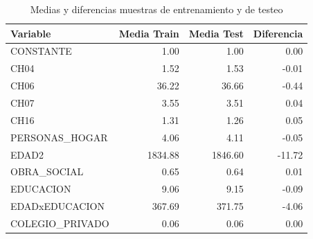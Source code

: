\begin{table}
\caption{Medias y diferencias muestras de entrenamiento y de testeo}
\label{tab:medias}
\begin{tabular}{lrrr}
\toprule
Variable & Media Train & Media Test & Diferencia \\
\midrule
CONSTANTE & 1.00 & 1.00 & 0.00 \\
CH04 & 1.52 & 1.53 & -0.01 \\
CH06 & 36.22 & 36.66 & -0.44 \\
CH07 & 3.55 & 3.51 & 0.04 \\
CH16 & 1.31 & 1.26 & 0.05 \\
PERSONAS_HOGAR & 4.06 & 4.11 & -0.05 \\
EDAD2 & 1834.88 & 1846.60 & -11.72 \\
OBRA_SOCIAL & 0.65 & 0.64 & 0.01 \\
EDUCACION & 9.06 & 9.15 & -0.09 \\
EDADxEDUCACION & 367.69 & 371.75 & -4.06 \\
COLEGIO_PRIVADO & 0.06 & 0.06 & 0.00 \\
\bottomrule
\end{tabular}
\end{table}
